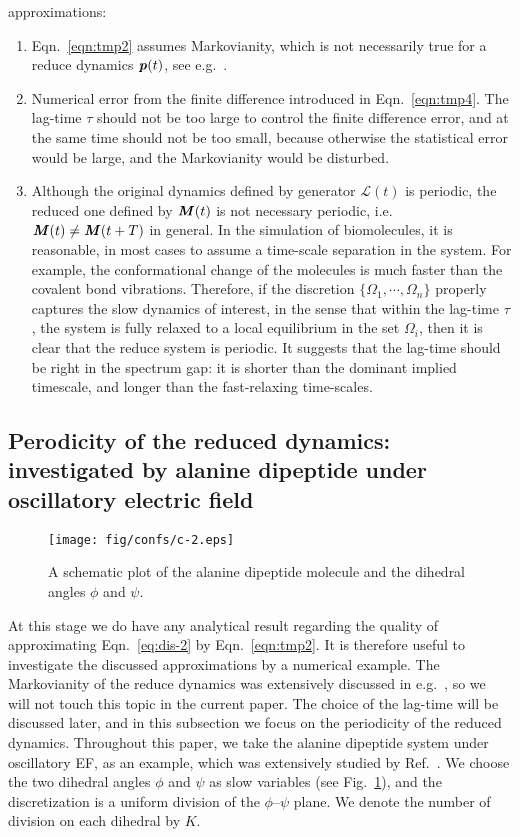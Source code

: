 \documentclass[aps, pre, preprint,unsortedaddress,a4paper,onecolumn]{revtex4}
\newcommand{\vect}[1]{\textbf{\textit{#1}}}
\newcommand{\ml}[0]{\mathcal {L}}
\begin{document}
approximations:
\begin{enumerate}
\item Eqn.~\eqref{eqn:tmp2} assumes Markovianity, which is not
  necessarily true for a reduce dynamics $\vect p(t)$, see e.g.~\cite{prinz2011markov}.
\item Numerical error from the finite difference introduced in
  Eqn.~\eqref{eqn:tmp4}. The lag-time $\tau$ should not be too large
  to control the finite difference error, and at the same time should
  not be too small, because otherwise the statistical error would be
  large, and the Markovianity would be disturbed.
\item Although the original dynamics defined by generator $\ml(t)$ is
  periodic, the reduced one defined by $\vect M(t)$ is not necessary
  periodic, i.e.~$\vect M(t) \neq \vect M(t+T)$ in general.  In the
  simulation of biomolecules, it is reasonable, in most cases to
  assume a time-scale separation in the system. For example, the
  conformational change of the molecules is much faster than the
  covalent bond vibrations. Therefore, if the discretion $\{ \Omega_1,
  \cdots, \Omega_n\}$ properly captures the slow dynamics of interest, in
  the sense that within the lag-time $\tau$, the system is fully
  relaxed to a local equilibrium in the set $\Omega_i$, then it is clear
  that the reduce system is periodic. It suggests that the lag-time
  should be right in the spectrum gap: it is shorter than the dominant
  implied timescale, and longer than the fast-relaxing time-scales.
\end{enumerate}


\subsection{Perodicity of the reduced dynamics: investigated by alanine dipeptide under oscillatory electric field}
\begin{figure}
  \centering
  \texttt{[image: fig/confs/c-2.eps]}
  \caption{A schematic plot of the alanine dipeptide molecule and the dihedral angles $\phi$ and $\psi$.}
  \label{fig:tmp1}
\end{figure}

At this stage we do have any analytical result regarding the quality
of approximating Eqn.~\eqref{eq:dis-2} by
Eqn.~\eqref{eqn:tmp2}.
It is therefore useful to investigate the discussed approximations
by a numerical example. The Markovianity of the reduce dynamics
was extensively discussed in e.g.~\cite{prinz2011markov}, so we 
will not touch this topic in the current paper. The choice of the lag-time
will be discussed later, and in this subsection we focus on the periodicity
of the reduced dynamics.
Throughout this paper, we take the alanine dipeptide system
under oscillatory EF, as an example, which was extensively studied by
Ref.~\cite{wang2014exploring}.
We choose the two dihedral angles $\phi$
and $\psi$ as slow variables (see Fig.~\ref{fig:tmp1}), and the discretization
is a uniform division of the $\phi$--$\psi$ plane. We denote the number of
division on each dihedral by $K$.
\end{document}
